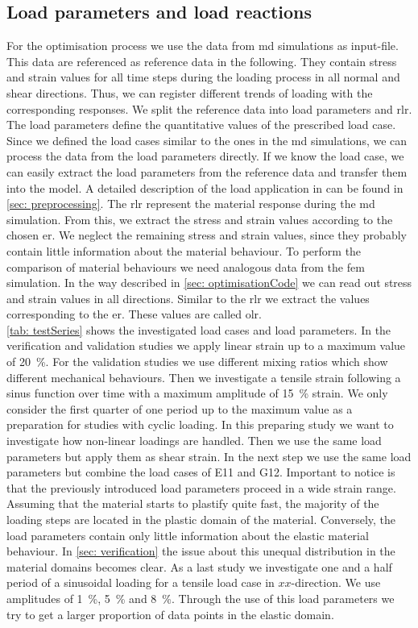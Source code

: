 \subsection{Load parameters and load reactions}\label{subsec:loadParameters}
For the optimisation process we use the data from \acrshort{md} simulations as input-file. This data are referenced as reference data in the following. They contain stress and strain values for all time steps during the loading process in all normal and shear directions. Thus, we can register different trends of loading with the corresponding responses.
We split the reference data into load parameters and \acrlong{rlr}. The load parameters define the quantitative values of the prescribed load case. 
Since we defined the load cases similar to the ones in the \acrshort{md} simulations, we can process the data from the load parameters directly.  If we know the load case, we can easily extract the load parameters from the reference data and transfer them into the  model. A detailed description of the load application in  can be found in \autoref{sec: preprocessing}. 
The \acrlong{rlr} represent the material response during the \acrshort{md} simulation. From this, we extract the stress and strain values according to the chosen \acrlong{er}. We neglect the remaining stress and strain values, since they probably contain little information about the material behaviour.
To perform the comparison of material behaviours we need analogous data from the \acrshort{fem} simulation. In the way described in \autoref{sec: optimisationCode} we can read out stress and strain values in all directions. Similar to the \acrlong{rlr} we extract the values corresponding to the \acrlong{er}. These values are called \acrlong{olr}. \\
\autoref{tab: testSeries} shows the investigated load cases and load parameters.
In the verification and validation studies we apply linear strain up to a maximum value of 20 \%. For the validation studies we use different mixing ratios which show different mechanical behaviours. Then we investigate a tensile strain following a sinus function over time with a maximum amplitude of 15 \% strain. We only consider the first quarter of one period up to the maximum value as a preparation for studies with cyclic loading. In this preparing study we want to investigate how non-linear loadings are handled. Then we use the same load parameters but apply them as shear strain. In the next step we use the same load parameters but combine the load cases of E11 and G12. Important to notice is that the previously introduced load parameters proceed in a wide strain range. Assuming that the material starts to plastify quite fast, the majority of the loading steps are located in the plastic domain of the material. Conversely, the load parameters contain only little information about the elastic material behaviour. In \autoref{sec: verification} the issue about this unequal distribution in the material domains becomes clear.    
As a last study we investigate one and a half period of a sinusoidal loading for a tensile load case in $xx$-direction. We use amplitudes of 1 \%, 5 \% and 8 \%. Through the use of this load parameters we try to get a larger proportion of data points in the elastic domain.

